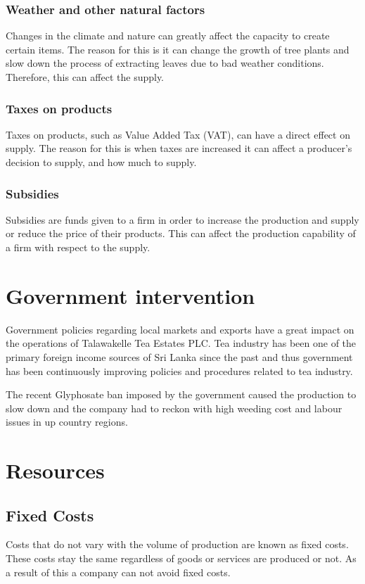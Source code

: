 \documentclass[12pt]{report}
\begin{document}
\subsection{Weather and other natural factors}
Changes in the climate and nature can greatly affect the capacity to create certain items. The reason for this is it can change the growth of tree plants and slow down the process of extracting leaves due to bad weather conditions. Therefore, this can affect the supply.

\subsection{Taxes on products}
Taxes on products, such as Value Added Tax (VAT), can have a direct effect on supply. The reason for this is when taxes are increased it can affect a producer’s decision to supply, and how much to supply.

\subsection{Subsidies}
Subsidies are funds given to a firm in order to increase the production and supply or reduce the price of their products. This can affect the production capability of a firm with respect to the supply.

\chapter{Government intervention}
Government policies regarding local markets and exports have a great impact on the operations of Talawakelle Tea Estates PLC. Tea industry has been one of the primary foreign income sources of Sri Lanka since the past and thus government has been continuously improving policies and procedures related to tea industry.

The recent Glyphosate ban imposed by the government caused the production to slow down and the company had to reckon with high weeding cost and labour issues in up country regions.

\chapter{Resources}

\section{Fixed Costs}
Costs that do not vary with the volume of production are known as fixed costs. These costs stay the same regardless of goods or services are produced or not. As a result of this a company can not avoid fixed costs.
\end{document}
